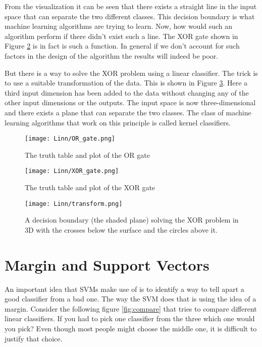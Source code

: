 \documentclass{../template/texnote}
\begin{document}
From the visualization it can be seen that there exists a straight line in the input space that can separate the two different classes. This decision boundary is what machine learning algorithms are trying to learn. Now, how would such an algorithm perform if there didn't exist such a line. The XOR gate shown in Figure \ref{fig:xor_gate} is in fact is such a function.  In general if we don't account for such factors in the design of the algorithm the results will indeed be poor.

But there is a way to solve the XOR problem using a linear classifier. The trick is to use a suitable transformation of the data. This is shown in Figure \ref{fig:transform}. Here a third input dimension has been added to the data without changing any of the other input dimensions or the outputs. The input space is now three-dimensional and there exists a plane that can separate the two classes.
The class of machine learning algorithms that work on this principle is called kernel classifiers. 

\begin{figure}
    \centering
    \texttt{[image: Linn/OR\_gate.png]}
    \caption{The truth table and plot of the OR gate}
    \label{fig:or_gate}
\end{figure}

\begin{figure}
    \centering
    \texttt{[image: Linn/XOR\_gate.png]}
    \caption{The truth table and plot of the XOR gate}
    \label{fig:xor_gate}
\end{figure}

\begin{figure}
    \centering
    \texttt{[image: Linn/transform.png]}
    \caption{A decision boundary (the shaded plane) solving the XOR problem in 3D with the crosses below the surface and the circles above it.}
    \label{fig:transform}
\end{figure}

\section{Margin and Support Vectors}
An important idea that SVMs make use of is to identify a way to tell apart a good classifier from a bad one. The way the SVM does that is using the idea of a margin. Consider the following figure \ref{fig:compare} that tries to compare different linear classifiers. If you had to pick one classifier from the three which one would you pick? Even though most people might choose the middle one, it is difficult to justify that choice. 
\end{document}
